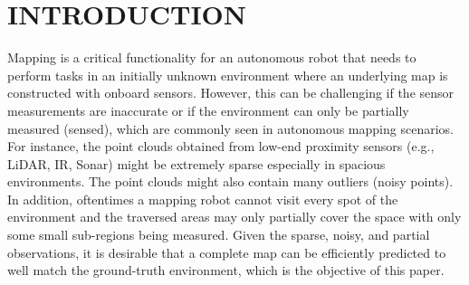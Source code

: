 \section{INTRODUCTION}
 

Mapping is a critical functionality for an autonomous robot that needs to perform tasks in an initially unknown environment where an underlying map is constructed with onboard sensors. 
However, this can be challenging if the sensor measurements are inaccurate or if the environment can only be partially measured (sensed), which are commonly seen in autonomous mapping scenarios. 
For instance, the point clouds obtained from low-end proximity sensors (e.g., LiDAR, IR, Sonar) might be extremely sparse especially in spacious environments. The point clouds might also contain many outliers (noisy points). In addition, oftentimes a mapping robot cannot visit every spot of the environment and the traversed areas may only partially cover the space with only some small sub-regions being measured. 
Given the sparse, noisy, and partial observations, it is desirable that a complete map can be efficiently predicted to well match the ground-truth environment, which is the objective of this paper. 

